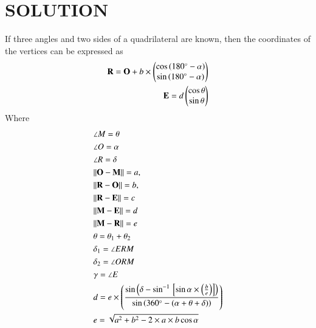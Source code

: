 \documentclass[journal,12pt,twocolumn]{IEEEtran}
\begin{document}
\section{SOLUTION}
\begin{lemma}
If three angles and two sides of a quadrilateral are known, then the coordinates of the vertices can be expressed as
\begin{align}
    \mathbf{R}=\mathbf{O}+b\times \begin{pmatrix}\cos {(180\degree-\alpha)} \\ \sin{(180\degree - \alpha)}\end{pmatrix}\\
    \mathbf{E}=d \begin{pmatrix}\cos \theta \\ \sin \theta\end{pmatrix}
\end{align}
Where
    \begin{align}
    &\angle M=\theta \label{eq1}
    \\
    &\angle O=\alpha
    \\
    &\angle R=\delta \label{eq2}
    \\
    &\lVert\mathbf{O}-\mathbf{M}\rVert =a, \label{eq3}
    \\
    &\lVert\mathbf{R}-\mathbf{O}\rVert =b,\label{eq4}
    \\
 &\lVert\mathbf{R}-\mathbf{E}\rVert=c
 \\
  &\lVert\mathbf{M}-\mathbf{E}\rVert =d 
  \\
    &\lVert\mathbf{M}-\mathbf{R}\rVert =e
  \\
  &\theta= \theta_1 + \theta_2
  \\
  & \delta_1=\angle ERM \\
  & \delta_2= \angle ORM\\
  & \gamma= \angle E\\
    &d=e \times \left(\frac{\sin\left({\delta-\sin^{-1}{}\left[\sin{\alpha}\times \left(\frac{b}{e}\right)\right]}\right)}{\sin\left({360\degree-(\alpha+\theta+\delta)}\right)}\right)\\
   & e=\sqrt{a^2+b^2-2\times a \times b\cos{\alpha}}
\end{align}
\end{lemma}
\end{document}
